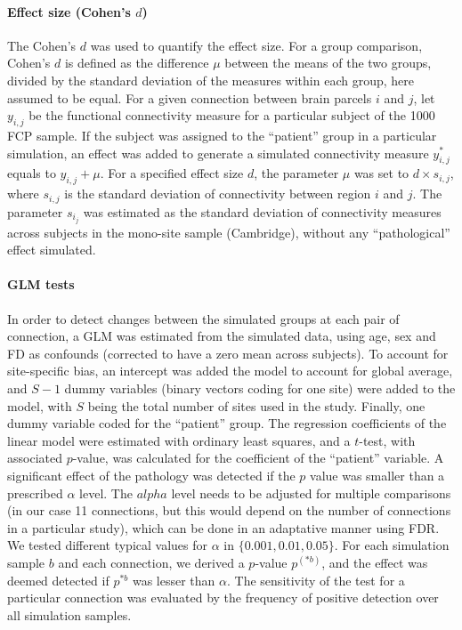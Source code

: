 \documentclass[authoryear]{elsarticle}
\begin{document}
\paragraph{Effect size (Cohen's $d$)}
The Cohen's $d$ was used to quantify the effect size. For a group comparison, Cohen's $d$ is defined as the difference $\mu$ between the means of the two groups, divided by the standard deviation of the measures within each group, here assumed to be equal. For a given connection between brain parcels $i$ and $j$, let $y_{i,j}$ be the functional connectivity measure for a particular subject of the 1000 FCP sample. If the subject was assigned to the ``patient'' group in a particular simulation, an effect was added to generate a simulated connectivity measure $y_{i,j}^*$ equals to $y_{i,j} + \mu$. For a specified effect size $d$, the parameter $\mu$ was set to $d\times s_{i,j}$, where $s_{i,j}$ is the standard deviation of connectivity between region $i$ and $j$. The parameter $s_{i_j}$ was estimated as the standard deviation of connectivity measures across subjects in the mono-site sample (Cambridge), without any ``pathological'' effect simulated.

\paragraph{GLM tests}
In order to detect changes between the simulated groups at each pair of connection, a GLM was estimated from the simulated data, using age, sex and FD as confounds (corrected to have a zero mean across subjects). To account for site-specific bias, an intercept was added the model to account for global average, and $S-1$ dummy variables (binary vectors coding for one site) were added to the model, with $S$ being the total number of sites used in the study. Finally, one dummy variable coded for the ``patient'' group. The regression coefficients of the linear model were estimated with ordinary least squares, and a $t$-test, with associated $p$-value, was calculated for the coefficient of the ``patient'' variable. A significant effect of the pathology was detected if the $p$ value was smaller than a prescribed $\alpha$ level. The $alpha$ level needs to be adjusted for multiple comparisons (in our case 11 connections, but this would depend on the number of connections in a particular study), which can be done in an adaptative manner using FDR. We tested different typical values for $\alpha$ in $\{0.001,0.01,0.05\}$. For each simulation sample $b$ and each connection, we derived a $p$-value $p^{(*b)}$, and the effect was deemed detected if $p^{*b}$ was lesser than $\alpha$. The sensitivity of the test for a particular connection was evaluated by the frequency of positive detection over all simulation samples.
\end{document}
